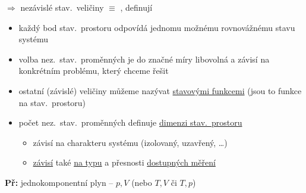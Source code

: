 \begin{definice}
$\Rightarrow$ nezávislé stav.\ veličiny $\equiv$ , definují 
\begin{itemize}[nosep]
  \item[--] každý bod stav.\ prostoru odpovídá jednomu možnému rovnovážnému stavu systému
  \item[--] volba nez.\ stav.\ proměnných je do značné míry libovolná a závisí na konkrétním problému, který chceme řešit
  \item[--] ostatní (závislé) veličiny můžeme nazývat \underline{stavovými funkcemi} (jsou to funkce na stav.\ prostoru)
\end{itemize}
\end{definice}

\begin{itemize}
  \item počet nez.\ stav.\ proměnných definuje \underline{dimenzi stav.\ prostoru}
  \begin{itemize}
    \item[--] závisí na charakteru systému (izolovaný, uzavřený, \dots)
    \item[--] \underline{závisí} také \underline{na typu} a přesnosti \underline{dostupných měření}
  \end{itemize}
\end{itemize}

\textbf{Př:} \quad jednokomponentní plyn -- $p, V$ \quad (nebo $T, V$ či $T, p$)

